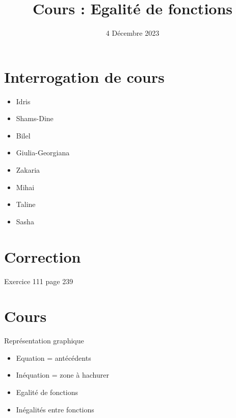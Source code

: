 \documentclass{article}
\title{Cours : Egalité de fonctions}
\author{}
\date{4 Décembre 2023}
\begin{document}
\maketitle
\section{Interrogation de cours}
\begin{itemize}
\item Idris 
\item Shams-Dine
\item Bilel
\item Giulia-Georgiana
\item Zakaria
\item Mihai
\item Taline
\item Sasha
\end{itemize}
\section{Correction}
Exercice 111 page 239
\section{Cours}
Représentation graphique
\begin{itemize}
\item Equation = antécédents
\item Inéquation = zone à hachurer
\item Egalité de fonctions
\item Inégalités entre fonctions
\end{itemize}
\end{document}
